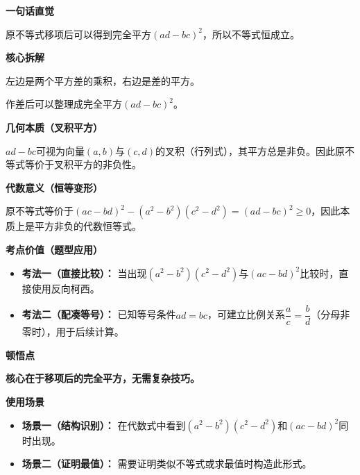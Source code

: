 \begin{explanationbox}
	\textbf{\textcolor{CExplanation}{一句话直觉}}

	原不等式移项后可以得到完全平方$(ad-bc)^2$，所以不等式恒成立。

	\medskip
	\textbf{\textcolor{CExplanation}{核心拆解}}
	\begin{description}[style=nextline, leftmargin=2.8em, labelsep=0.5em, itemsep=0.45em]
		\item[\textbf{要点一（平方差结构）：}] 左边是两个平方差的乘积，右边是差的平方。
		\item[\textbf{要点二（配方转换）：}] 作差后可以整理成完全平方$(ad-bc)^2$。
	\end{description}

	\medskip
	\textbf{\textcolor{CExplanation}{几何本质（叉积平方）}}

	$ad-bc$可视为向量$(a,b)$与$(c,d)$的叉积（行列式），其平方总是非负。因此原不等式等价于叉积平方的非负性。

	\medskip
	\textbf{\textcolor{CExplanation}{代数意义（恒等变形）}}

	原不等式等价于$(ac-bd)^2-(a^2-b^2)(c^2-d^2)=(ad-bc)^2\ge0$，因此本质上是平方非负的代数恒等式。

	\medskip
	\textbf{\textcolor{CExplanation}{考点价值（题型应用）}}
	\begin{itemize}[leftmargin=*, itemsep=0.5em, topsep=0.4em]
		\item \textbf{考法一（直接比较）：} 当出现$(a^2-b^2)(c^2-d^2)$与$(ac-bd)^2$比较时，直接使用反向柯西。
		\item \textbf{考法二（配凑等号）：} 已知等号条件$ad=bc$，可建立比例关系$\dfrac{a}{c}=\dfrac{b}{d}$（分母非零时），用于后续计算。
	\end{itemize}

	\medskip
	\textbf{\textcolor{CExplanation}{顿悟点}}

	\textbf{核心在于移项后的完全平方，无需复杂技巧。}

	\medskip
	\textbf{\textcolor{CExplanation}{使用场景}}
	\begin{itemize}[leftmargin=*, itemsep=0.5em, topsep=0.4em]
		\item \textbf{场景一（结构识别）：} 在代数式中看到$(a^2-b^2)(c^2-d^2)$和$(ac-bd)^2$同时出现。
		\item \textbf{场景二（证明最值）：} 需要证明类似不等式或求最值时构造此形式。
	\end{itemize}
\end{explanationbox}
